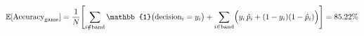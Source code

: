 \begin{equation}
\mathbb{E}[\text{Accuracy}_{\text{game}}] = \frac{1}{N}\Biggl[\sum_{i \notin \text{band}} \mathbb{1}\bigl(\text{decision}_i = y_i\bigr)
+ \sum_{i \in \text{band}} \Bigl(y_i\,\hat{p}_i + (1-y_i)(1-\hat{p}_i)\Bigr)\Biggr] = 85.22\%
\end{equation}
